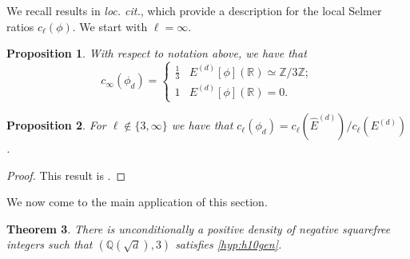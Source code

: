 \documentclass[12pt]{amsart}
\newtheorem{theorem}{Theorem}[section]
\newtheorem{proposition}[theorem]{Proposition}
\newcommand{\Z}{\mathbb{Z}}
\newcommand{\Q}{\mathbb{Q}}
\numberwithin{equation}{section}
\begin{document}
We recall results in \emph{loc. cit.}, which provide a description for the local Selmer ratios $c_\ell(\phi)$. We start with $\ell=\infty$. 

\begin{proposition}\label{R}
With respect to notation above, we have that
\begin{equation*}c_\infty(\phi_d) = 
\begin{cases}
\frac{1}{3} & E^{(d)}[\phi](\mathbb{R}) \simeq \Z/3\Z; \\
1 & E^{(d)}[\phi](\mathbb{R}) = 0.
\end{cases}\end{equation*}
\end{proposition} 


\begin{proposition}
    \label{cor:tamag}
For $\ell\notin \{3, \infty\}$ we have that $c_\ell(\phi_d) = c_\ell(\widehat{E}^{(d)})/c_\ell(E^{(d)})$.
\end{proposition}
\begin{proof}
This result is \cite[Corollary 10.3]{BKOS}.
\end{proof}

We now come to the main application of this section. 

\begin{theorem}\label{lastthm 2}
There is unconditionally a positive density of negative squarefree integers such that $(\Q(\sqrt d),3)$ satisfies \eqref{hyp:h10gen}.
\end{theorem}
\end{document}

